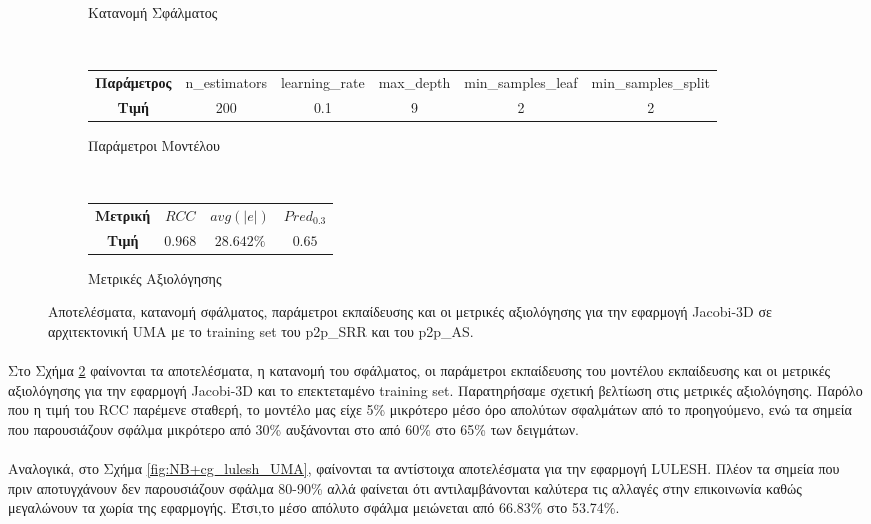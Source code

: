 \begin{figure}[ht]
\begin{subfigure}[b]{0.47\textwidth}
        \caption{Κατανομή Σφάλματος}
        \label{fig:NB_cg_jacobi_UMA_err}
    \end{subfigure} 
    \\[0.3cm]
    \begin{subfigure}[b]{\textwidth}
   	 	\scriptsize
		\begin{tabular}{c||c|c|c|c|c}
			\textbf{Παράμετρος} & n\_estimators & learning\_rate & max\_depth & min\_samples\_leaf & min\_samples\_split \\
			\textbf{Τιμή}       &       200        &  0.1               & 9          &  2                  &    2                 
		\end{tabular}
		\caption{Παράμετροι Μοντέλου}
    \end{subfigure}
    \\[0.3cm]
    \begin{subfigure}[b]{\textwidth}
    		\centering
   	 	\scriptsize
		\begin{tabular}{c||c|c|c}
			\textbf{Μετρική} & $RCC$ &   $avg(|e|)$ & $Pred_{0.3}$  \\
			\textbf{Τιμή}  &  $0.968$   &      $28.642\%
			$        &  $0.65$                                         
		\end{tabular}
		\caption{Μετρικές Αξιολόγησης}
    \end{subfigure}
    
        \caption{Αποτελέσματα, κατανομή σφάλματος, παράμετροι εκπαίδευσης και οι μετρικές αξιολόγησης για την εφαρμογή Jacobi-3D σε αρχιτεκτονική UMA με το training set του p2p\_SRR και του p2p\_AS. }
    \label{fig:NB+cg_jacobi_UMA}
\end{figure}
\paragraph{}
Στο Σχήμα \ref{fig:NB+cg_jacobi_UMA} φαίνονται τα αποτελέσματα, η κατανομή του σφάλματος, οι παράμετροι εκπαίδευσης του μοντέλου εκπαίδευσης και οι μετρικές αξιολόγησης για την εφαρμογή Jacobi-3D και το επεκτεταμένο training set. Παρατηρήσαμε σχετική βελτίωση στις μετρικές αξιολόγησης. Παρόλο που η τιμή του RCC παρέμενε σταθερή, το μοντέλο μας είχε 5\% μικρότερο μέσο όρο απολύτων σφαλμάτων από το προηγούμενο, ενώ τα σημεία που παρουσιάζουν σφάλμα μικρότερο από 30\% αυξάνονται στο από 60\% στο 65\% των δειγμάτων. 


\paragraph{}
Αναλογικά, στο Σχήμα \ref{fig:NB+cg_lulesh_UMA}, φαίνονται τα αντίστοιχα αποτελέσματα για την εφαρμογή LULESH. Πλέον τα σημεία που πριν αποτυγχάνουν δεν παρουσιάζουν σφάλμα 80-90\% αλλά φαίνεται ότι αντιλαμβάνονται καλύτερα τις αλλαγές στην επικοινωνία καθώς μεγαλώνουν τα χωρία της εφαρμογής. Έτσι,το μέσο απόλυτο σφάλμα μειώνεται από 66.83\% στο 53.74\%. 

